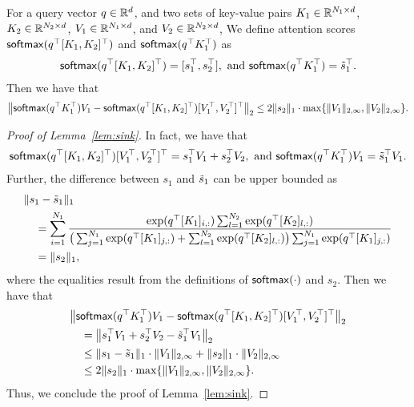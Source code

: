 \begin{lemma}\label{lem:sink}
    For a query vector $q\in\mathbb{R}^{d}$, and two sets of key-value pairs $K_{1}\in\mathbb{R}^{N_{1}\times d}$, $K_{2}\in\mathbb{R}^{N_{2}\times d}$, $V_{1}\in\mathbb{R}^{N_{1}\times d}$, and $V_{2}\in\mathbb{R}^{N_{2}\times d}$, We define attention scores $\mathsf{softmax}(q^{\top}[K_{1},K_{2}]^{\top})$ and $\mathsf{softmax}(q^{\top}K_{1}^{\top})$ as 
    \begin{align*}
        \mathsf{softmax}(q^{\top}[K_{1},K_{2}]^{\top}) = [s_{1}^{\top},s_{2}^{\top}],\text{ and } \mathsf{softmax}(q^{\top}K_{1}^{\top})=\tilde{s}_{1}^{\top}.
    \end{align*}
    Then we have that
    \begin{align*}
        \big\|\mathsf{softmax}(q^{\top}K_{1}^{\top})V_{1}-\mathsf{softmax}(q^{\top}[K_{1},K_{2}]^{\top})[V_{1}^{\top},V_{2}^{\top}]^{\top}\big\|_{2}\leq 2\|s_{2}\|_{1}\cdot \max\{\|V_{1}\|_{2,\infty},\|V_{2}\|_{2,\infty}\}.
    \end{align*}
\end{lemma}
\begin{proof}[Proof of Lemma~\ref{lem:sink}]
    
    In fact, we have that
    \begin{align*}
        \mathsf{softmax}(q^{\top}[K_{1},K_{2}]^{\top})[V_{1}^{\top},V_{2}^{\top}]^{\top}= s_{1}^{\top}V_{1}+s_{2}^{\top}V_{2},\text{ and }\mathsf{softmax}(q^{\top}K_{1}^{\top})V_{1}=\tilde{s}_{1}^{\top}V_{1}.
    \end{align*}
    Further, the difference between $s_{1}$ and $\tilde{s}_{1}$ can be upper bounded as 
    \begin{align*}
        &\|s_{1}-\tilde{s}_{1}\|_{1}\nonumber\\
        &\quad = \sum_{i=1}^{N_{1}}\frac{\exp(q^{\top}[K_{1}]_{i,:})\sum_{l=1}^{N_{2}}\exp(q^{\top}[K_{2}]_{l,:})}{\big(\sum_{j=1}^{N_{1}}\exp(q^{\top}[K_{1}]_{j,:})+\sum_{l=1}^{N_{2}}\exp(q^{\top}[K_{2}]_{l,:})\big)\sum_{j=1}^{N_{1}}\exp(q^{\top}[K_{1}]_{j,:})}\nonumber\\
        &\quad = \|s_{2}\|_{1},
    \end{align*}
    where the equalities result from the definitions of $\mathsf{softmax}(\cdot)$ and $s_{2}$. Then we have that
    \begin{align*}
        &\big\|\mathsf{softmax}(q^{\top}K_{1}^{\top})V_{1}-\mathsf{softmax}(q^{\top}[K_{1},K_{2}]^{\top})[V_{1}^{\top},V_{2}^{\top}]^{\top}\big\|_{2}\nonumber\\
        &\quad = \big\|s_{1}^{\top}V_{1}+s_{2}^{\top}V_{2}- \tilde{s}_{1}^{\top}V_{1}\big\|_{2}\nonumber\\
        &\quad \leq \|s_{1}-\tilde{s}_{1}\|_{1}\cdot \|V_{1}\|_{2,\infty}+\|s_{2}\|_{1}\cdot \|V_{2}\|_{2,\infty}\nonumber\\
        &\quad \leq 2\|s_{2}\|_{1}\cdot \max\{\|V_{1}\|_{2,\infty},\|V_{2}\|_{2,\infty}\}.
    \end{align*}
    Thus, we conclude the proof of Lemma~\ref{lem:sink}.
    
\end{proof}
